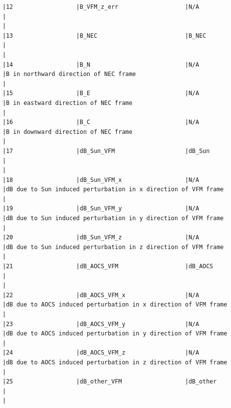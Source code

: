 \begin{verbatim}
|12                  |B_VFM_z_err                   |N/A                           |                                                                                                    |
|13                  |B_NEC                         |B_NEC                         |                                                                                                    |
|14                  |B_N                           |N/A                           |B in northward direction of NEC frame                                                               |
|15                  |B_E                           |N/A                           |B in eastward direction of NEC frame                                                                |
|16                  |B_C                           |N/A                           |B in downward direction of NEC frame                                                                |
|17                  |dB_Sun_VFM                    |dB_Sun                        |                                                                                                    |
|18                  |dB_Sun_VFM_x                  |N/A                           |dB due to Sun induced perturbation in x direction of VFM frame                                      |
|19                  |dB_Sun_VFM_y                  |N/A                           |dB due to Sun induced perturbation in y direction of VFM frame                                      |
|20                  |dB_Sun_VFM_z                  |N/A                           |dB due to Sun induced perturbation in z direction of VFM frame                                      |
|21                  |dB_AOCS_VFM                   |dB_AOCS                       |                                                                                                    |
|22                  |dB_AOCS_VFM_x                 |N/A                           |dB due to AOCS induced perturbation in x direction of VFM frame                                     |
|23                  |dB_AOCS_VFM_y                 |N/A                           |dB due to AOCS induced perturbation in y direction of VFM frame                                     |
|24                  |dB_AOCS_VFM_z                 |N/A                           |dB due to AOCS induced perturbation in z direction of VFM frame                                     |
|25                  |dB_other_VFM                  |dB_other                      |                                                                                                    |

\end{verbatim}
